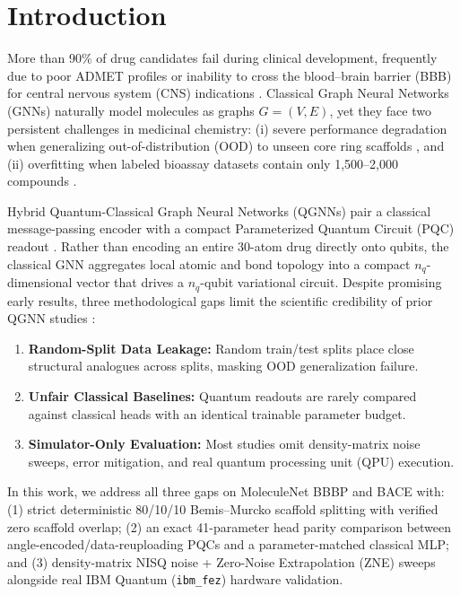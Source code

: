 \documentclass[conference]{IEEEtran}
\begin{document}
\section{Introduction}
More than 90\% of drug candidates fail during clinical development, frequently due to poor ADMET profiles or inability to cross the blood--brain barrier (BBB) for central nervous system (CNS) indications \cite{martins2012bayesian,molsurvey2026}. Classical Graph Neural Networks (GNNs) naturally model molecules as graphs $G=(V,E)$, yet they face two persistent challenges in medicinal chemistry: (i) severe performance degradation when generalizing out-of-distribution (OOD) to unseen core ring scaffolds \cite{bemis1996properties,wu2018moleculenet}, and (ii) overfitting when labeled bioassay datasets contain only 1,500--2,000 compounds \cite{subramanian2016computational}.

Hybrid Quantum-Classical Graph Neural Networks (QGNNs) pair a classical message-passing encoder with a compact Parameterized Quantum Circuit (PQC) readout \cite{hybridqgnn2024,bergholm2018pennylane}. Rather than encoding an entire 30-atom drug directly onto qubits, the classical GNN aggregates local atomic and bond topology into a compact $n_q$-dimensional vector that drives a $n_q$-qubit variational circuit. Despite promising early results, three methodological gaps limit the scientific credibility of prior QGNN studies \cite{molsurvey2026}:
\begin{enumerate}
    \item \textbf{Random-Split Data Leakage:} Random train/test splits place close structural analogues across splits, masking OOD generalization failure.
    \item \textbf{Unfair Classical Baselines:} Quantum readouts are rarely compared against classical heads with an identical trainable parameter budget.
    \item \textbf{Simulator-Only Evaluation:} Most studies omit density-matrix noise sweeps, error mitigation, and real quantum processing unit (QPU) execution.
\end{enumerate}

In this work, we address all three gaps on MoleculeNet BBBP and BACE \cite{wu2018moleculenet} with: (1) strict deterministic 80/10/10 Bemis--Murcko scaffold splitting with verified zero scaffold overlap; (2) an exact 41-parameter head parity comparison between angle-encoded/data-reuploading PQCs and a parameter-matched classical MLP; and (3) density-matrix NISQ noise + Zero-Noise Extrapolation (ZNE) sweeps alongside real IBM Quantum (\texttt{ibm\_fez}) hardware validation.
\end{document}
